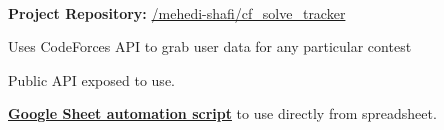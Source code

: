  \\
\vspace{\topsep}
{\bf Project Repository: }\href{https://github.com/mehedi-shafi/cf_solve_tracker}{\github/mehedi-shafi/cf\_solve\_tracker}
\vspace{\topsep}

\begin{tightitemize}

\item Uses CodeForces API to grab user data for any particular contest
\item Public API exposed to use.
\item \href{https://gist.github.com/mehedi-shafi/0347e59d54f2a198fc12dca167394f43}{\bf Google Sheet automation script} to use directly from spreadsheet.

\end{tightitemize}

\sectionspace